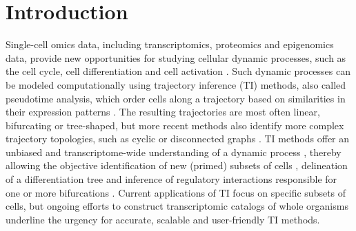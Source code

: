 \section{Introduction}
Single-cell omics data, including transcriptomics, proteomics and epigenomics data, provide new opportunities for studying cellular dynamic processes, such as the cell cycle, cell differentiation and cell activation \cite{tanay_scalingsinglecellgenomics_2017,etzrodt_quantitativesinglecellapproaches_2014}. Such dynamic processes can be modeled computationally using trajectory inference (TI) methods, also called pseudotime analysis, which order cells along a trajectory based on similarities in their expression patterns \cite{trapnell_definingcelltypes_2015,cannoodt_computationalmethodstrajectory_2016,moon_manifoldlearningbasedmethods_2018}. The resulting trajectories are most often linear, bifurcating or tree-shaped, but more recent methods also identify more complex trajectory topologies, such as cyclic \cite{liu_reconstructingcellcycle_2017} or disconnected graphs \cite{wolf_graphabstractionreconciles_2017}. TI methods offer an unbiased and transcriptome-wide understanding of a dynamic process \cite{tanay_scalingsinglecellgenomics_2017}, thereby allowing the objective identification of new (primed) subsets of cells \cite{schlitzer_identificationcdc1cdc2committed_2015}, delineation of a differentiation tree \cite{velten_humanhaematopoieticstem_2017,see_mappinghumandc_2017} and inference of regulatory interactions responsible for one or more bifurcations \cite{aibar_scenicsinglecellregulatory_2017}. Current applications of TI focus on specific subsets of cells, but ongoing efforts to construct transcriptomic catalogs of whole organisms \cite{regev_humancellatlas_2017,han_mappingmousecell_2018,schaum_singlecelltranscriptomics20_2018} underline the urgency for accurate, scalable \cite{aibar_scenicsinglecellregulatory_2017,angerer_singlecellsmake_2017} and user-friendly TI methods.

